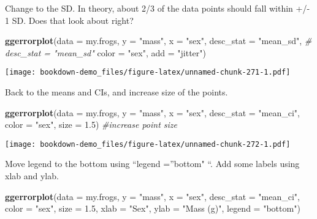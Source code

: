 \documentclass[]{book}
\newenvironment{Shaded}{\begin{snugshade}}{\end{snugshade}}
\newcommand{\KeywordTok}[1]{\textcolor[rgb]{0.13,0.29,0.53}{\textbf{#1}}}
\newcommand{\DataTypeTok}[1]{\textcolor[rgb]{0.13,0.29,0.53}{#1}}
\newcommand{\FloatTok}[1]{\textcolor[rgb]{0.00,0.00,0.81}{#1}}
\newcommand{\StringTok}[1]{\textcolor[rgb]{0.31,0.60,0.02}{#1}}
\newcommand{\CommentTok}[1]{\textcolor[rgb]{0.56,0.35,0.01}{\textit{#1}}}
\newcommand{\NormalTok}[1]{#1}
\theoremstyle{definition}
\theoremstyle{definition}
\theoremstyle{definition}
\theoremstyle{remark}
\begin{document}
Change to the SD. In theory, about 2/3 of the data points should fall
within +/- 1 SD. Does that look about right?

\begin{Shaded}
\begin{Highlighting}[]
\KeywordTok{ggerrorplot}\NormalTok{(}\DataTypeTok{data =}\NormalTok{ my.frogs,}
          \DataTypeTok{y =} \StringTok{"mass"}\NormalTok{,}
          \DataTypeTok{x =} \StringTok{"sex"}\NormalTok{,}
          \DataTypeTok{desc_stat =} \StringTok{"mean_sd"}\NormalTok{,  }\CommentTok{# desc_stat = "mean_sd"}
          \DataTypeTok{color =} \StringTok{"sex"}\NormalTok{,}
          \DataTypeTok{add =} \StringTok{"jitter"}\NormalTok{)}
\end{Highlighting}
\end{Shaded}

\texttt{[image: bookdown-demo\_files/figure-latex/unnamed-chunk-271-1.pdf]}

Back to the means and CIs, and increase size of the points.

\begin{Shaded}
\begin{Highlighting}[]
\KeywordTok{ggerrorplot}\NormalTok{(}\DataTypeTok{data =}\NormalTok{ my.frogs,}
          \DataTypeTok{y =} \StringTok{"mass"}\NormalTok{,}
          \DataTypeTok{x =} \StringTok{"sex"}\NormalTok{,}
          \DataTypeTok{desc_stat =} \StringTok{"mean_ci"}\NormalTok{,}
          \DataTypeTok{color =} \StringTok{"sex"}\NormalTok{,}
          \DataTypeTok{size =} \FloatTok{1.5}\NormalTok{)           }\CommentTok{#increase point size}
\end{Highlighting}
\end{Shaded}

\texttt{[image: bookdown-demo\_files/figure-latex/unnamed-chunk-272-1.pdf]}

Move legend to the bottom using ``legend =''bottom" ``. Add some labels
using xlab and ylab.

\begin{Shaded}
\begin{Highlighting}[]
\KeywordTok{ggerrorplot}\NormalTok{(}\DataTypeTok{data =}\NormalTok{ my.frogs,}
          \DataTypeTok{y =} \StringTok{"mass"}\NormalTok{,}
          \DataTypeTok{x =} \StringTok{"sex"}\NormalTok{,}
          \DataTypeTok{desc_stat =} \StringTok{"mean_ci"}\NormalTok{,}
          \DataTypeTok{color =} \StringTok{"sex"}\NormalTok{,}
          \DataTypeTok{size =} \FloatTok{1.5}\NormalTok{,}
          \DataTypeTok{xlab =} \StringTok{"Sex"}\NormalTok{,}
          \DataTypeTok{ylab =} \StringTok{"Mass (g)"}\NormalTok{,}
          \DataTypeTok{legend =} \StringTok{"bottom"}\NormalTok{) }
\end{Highlighting}
\end{Shaded}
\end{document}
